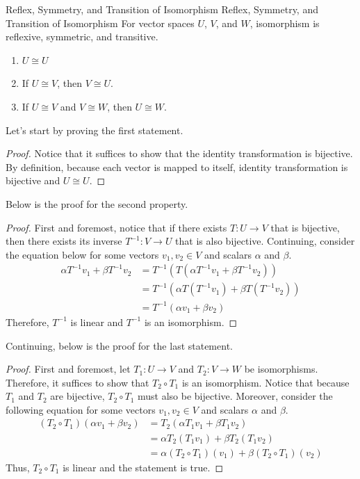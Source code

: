 \documentclass[../main.tex]{subfiles}
\begin{document}
\begin{theorem}{Reflex, Symmetry, and Transition of Isomorphism}
{Reflex, Symmetry, and Transition of Isomorphism}
For vector spaces $U$, $V$, and $W$, isomorphism is reflexive,
symmetric, and transitive.
\begin{enumerate}[noitemsep]
\item $U \cong U$
\item If $U \cong V$, then $V \cong U$.
\item If $U \cong V$ and $V \cong W$, then $U \cong W$.
\end{enumerate}
\end{theorem}

Let's start by proving the first statement.

\begin{proof}
Notice that it suffices to show that the identity transformation
is bijective. By definition, because each vector is mapped to
itself, identity transformation is bijective and $U \cong U$.
\end{proof}

Below is the proof for the second property.

\begin{proof}
First and foremost, notice that if there exists $T: U \to V$ that
is bijective, then there exists its inverse $T^{-1}: V \to U$
that is also bijective. Continuing, consider the equation below
for some vectors $v_1, v_2 \in V$ and scalars $\alpha$ and $\beta$.
\begin{align*}
    \alpha T^{-1} v_1 + \beta T^{-1} v_2
    &= T^{-1} \left(
        T \left( \alpha T^{-1} v_1 + \beta T^{-1} v_2 \right)
    \right) \\
    &= T^{-1} \left(
        \alpha T \left( T^{-1} v_1 \right) +
            \beta T \left( T^{-1} v_2 \right)
    \right) \\
    &= T^{-1} \left( \alpha v_1 + \beta v_2 \right)
\end{align*}
Therefore, $T^{-1}$ is linear and $T^{-1}$ is an isomorphism.
\end{proof}

Continuing, below is the proof for the last statement.

\begin{proof}
First and foremost, let $T_1: U \to V$ and $T_2: V \to W$ be
isomorphisms. Therefore, it suffices to show that $T_2 \circ T_1$
is an isomorphism. Notice that because $T_1$ and $T_2$ are
bijective, $T_2 \circ T_1$ must also be bijective. Moreover,
consider the following equation for some vectors $v_1, v_2 \in V$
and scalars $\alpha$ and $\beta$.
\begin{align*}
    (T_2 \circ T_1) (\alpha v_1 + \beta v_2)
    &= T_2 (\alpha T_1v_1 + \beta T_1v_2) \\
    &= \alpha T_2 (T_1v_1) + \beta T_2 (T_1v_2) \\
    &= \alpha (T_2 \circ T_1) (v_1) + \beta (T_2 \circ T_1) (v_2)
\end{align*}
Thus, $T_2 \circ T_1$ is linear and the statement is true.
\end{proof}
\end{document}
